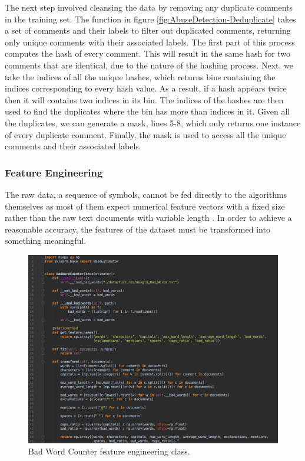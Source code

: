 The next step involved cleansing the data by removing any duplicate comments in the training set. The function in figure \ref{fig:AbuseDetection-Deduplicate} takes a set of comments and their labels to filter out duplicated comments, returning only unique comments with their associated labels. The first part of this process computes the hash of every comment. This will result in the same hash for two comments that are identical, due to the nature of the hashing process. Next, we take the indices of all the unique hashes, which returns bins containing the indices corresponding to every hash value. As a result, if a hash appears twice then it will contains two indices in its bin. The indices of the hashes are then used to find the duplicates where the bin has more than indices in it. Given all the duplicates, we can generate a mask, lines 5-8, which only returns one instance of every duplicate comment. Finally, the mask is used to access all the unique comments and their associated labels.

\subsubsection{Feature Engineering}
The raw data, a sequence of symbols, cannot be fed directly to the algorithms themselves as most of them expect numerical feature vectors with a fixed size rather than the raw text documents with variable length \cite{scikit:tfidf}. In order to achieve a reasonable accuracy, the features of the dataset must be transformed into something meaningful.


\begin{figure}[H]
	\centering
	\includegraphics[width=\textwidth]{Images/Implementation/DataProcessing/AbuseDetection/BadWordCounter}
	\caption{Bad Word Counter feature engineering class.}
	\label{fig:AbuseDetection-BadWordCounter}
\end{figure}


